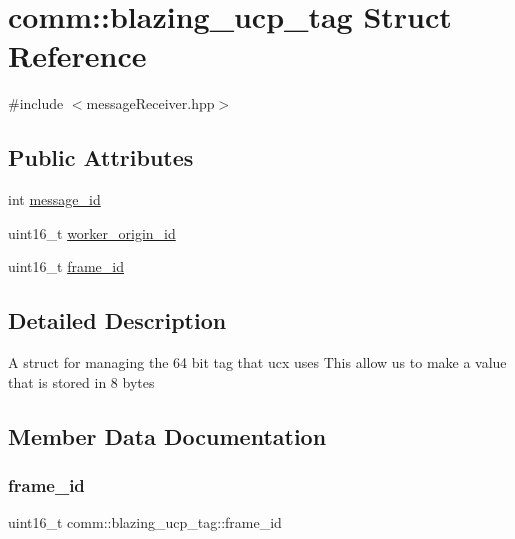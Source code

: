 \hypertarget{structcomm_1_1blazing__ucp__tag}{}\section{comm\+:\+:blazing\+\_\+ucp\+\_\+tag Struct Reference}
\label{structcomm_1_1blazing__ucp__tag}


{\ttfamily \#include $<$message\+Receiver.\+hpp$>$}

\subsection*{Public Attributes}
\begin{DoxyCompactItemize}
\item 
int \hyperlink{structcomm_1_1blazing__ucp__tag_a31f59e8f5c2a690df88ca3a4147ef942}{message\+\_\+id}
\item 
uint16\+\_\+t \hyperlink{structcomm_1_1blazing__ucp__tag_ae34c2b757572ae3316c4c52b220e368b}{worker\+\_\+origin\+\_\+id}
\item 
uint16\+\_\+t \hyperlink{structcomm_1_1blazing__ucp__tag_ae5f3239906e71a91821ae27d4ec17325}{frame\+\_\+id}
\end{DoxyCompactItemize}


\subsection{Detailed Description}
A struct for managing the 64 bit tag that ucx uses This allow us to make a value that is stored in 8 bytes 

\subsection{Member Data Documentation}
\mbox{\label{structcomm_1_1blazing__ucp__tag_ae5f3239906e71a91821ae27d4ec17325}} 
\subsubsection{\texorpdfstring{frame\+\_\+id}{frame\_id}}
{\footnotesize\ttfamily uint16\+\_\+t comm\+::blazing\+\_\+ucp\+\_\+tag\+::frame\+\_\+id}

